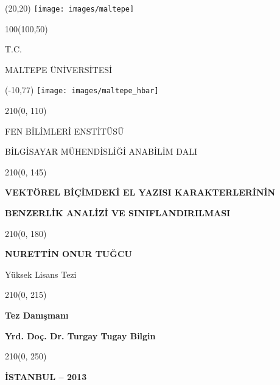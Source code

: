 \begin{titlepage}
\begin{textblock}{0}(20,20)
	\texttt{[image: images/maltepe]}
\end{textblock}

\begin{textblock}{100}(100,50)
	\centering
	\begin{large}
	T.C.
		
	MALTEPE ÜNİVERSİTESİ
	\end{large}
\end{textblock}

\begin{textblock}{0}(-10,77)
	\texttt{[image: images/maltepe\_hbar]}
\end{textblock}

\begin{textblock}{210}(0, 110)
	\centering
	\begin{large}
	FEN BİLİMLERİ ENSTİTÜSÜ
	
	\vspace{\baselineskip}
	BİLGİSAYAR MÜHENDİSLİĞİ ANABİLİM DALI
	\end{large}
\end{textblock}

\begin{textblock}{210}(0, 145)
	\centering
	
	\begin{large}	
		\textbf{VEKTÖREL BİÇİMDEKİ EL YAZISI KARAKTERLERİNİN}
		
		\vspace{\baselineskip}
		\textbf{BENZERLİK ANALİZİ VE SINIFLANDIRILMASI}
	\end{large}
\end{textblock}

\begin{textblock}{210}(0, 180)
	\centering
	
	\begin{large}	
		\textbf{NURETTİN ONUR TUĞCU}
		
		\vspace{\baselineskip}
		Yüksek Lisans Tezi
	\end{large}
\end{textblock}

\begin{textblock}{210}(0, 215)
	\centering
	
	\begin{large}	
		\textbf{Tez Danışmanı}
		
		\vspace{\baselineskip}
		\textbf{Yrd. Doç. Dr. Turgay Tugay Bilgin}
	\end{large}
\end{textblock}
\begin{textblock}{210}(0, 250)
	\centering
	
	\begin{large}	
		\textbf{İSTANBUL – 2013}
	\end{large}
\end{textblock}
\end{titlepage}

